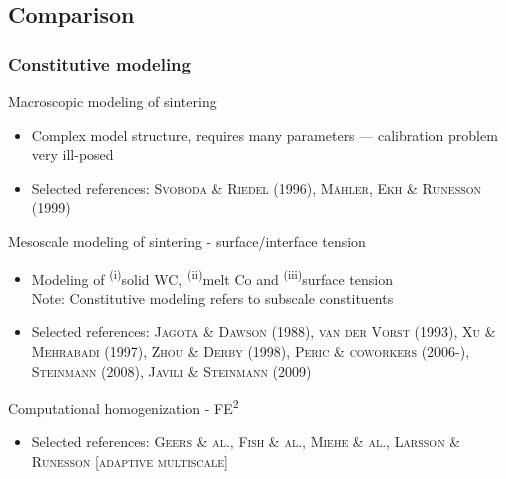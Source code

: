 \documentclass[11pt]{beamer} %
\newcommand{\roughcite}[1]{\textsc{#1}}
\begin{document}
\subsection{Comparison}
\begin{frame}
 \frametitle{Constitutive modeling}
 Macroscopic modeling of sintering
 \begin{itemize}
  \item Complex model structure, requires many parameters --- calibration problem very ill-posed
  \item Selected references: \roughcite{Svoboda \& Riedel (1996)}, \roughcite{Mähler, Ekh \& Runesson (1999)}
 \end{itemize}

Mesoscale modeling of sintering - surface/interface tension
 \begin{itemize}
 \item Modeling of \textsuperscript{(i)}solid WC, \textsuperscript{(ii)}melt Co and \textsuperscript{(iii)}surface tension\\
  Note: Constitutive modeling refers to subscale constituents
  \item Selected references: \roughcite{Jagota \& Dawson (1988)}, \roughcite{van der Vorst (1993)}, \roughcite{Xu \& Mehrabadi (1997)}, \roughcite{Zhou \& Derby (1998)}, \roughcite{Peric \& coworkers (2006-)}, \roughcite{Steinmann (2008)}, \roughcite{Javili \& Steinmann (2009)}
 \end{itemize}

Computational homogenization - FE\textsuperscript{2}
\begin{itemize}
  \item Selected references:  \roughcite{Geers \& al.},  \roughcite{Fish \& al.},
 \roughcite{Miehe \& al.}, \roughcite{Larsson \& Runesson [adaptive multiscale]}
\end{itemize}
\end{frame}

\end{document}
